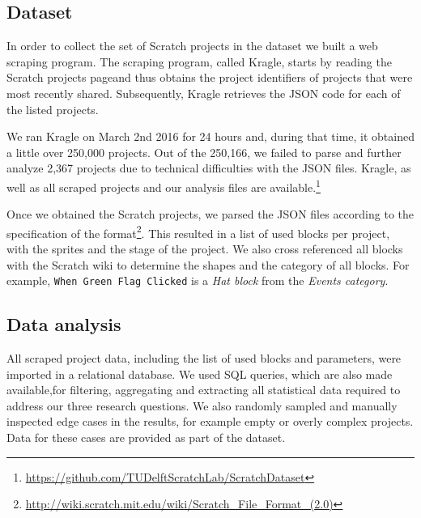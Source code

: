 \documentclass{sig-alternate-05-2015}
\newcommand{\nPrograms}{250,166}
\begin{document}
\subsection{Dataset}
\label{dataset}

In order to collect the set of Scratch projects in the dataset we built a web scraping program. The scraping program, called Kragle, starts by reading the Scratch projects page\footnotemark[\ref{scratchpublic}] and thus obtains the project identifiers of projects that were most recently shared. Subsequently, Kragle retrieves the JSON code for each of the listed projects. 


We ran Kragle on March 2nd 2016 for 24 hours and, during that time, it obtained a little over 250,000 projects. Out of the \nPrograms, we failed to parse and further analyze 2,367 projects due to technical difficulties with the JSON files. Kragle, as well as all scraped projects and our analysis files are available.\footnote{\label{repo}\url{https://github.com/TUDelftScratchLab/ScratchDataset}}

Once we obtained the Scratch projects, we parsed the JSON files according to the specification of the format\footnote{\url{http://wiki.scratch.mit.edu/wiki/Scratch_File_Format_(2.0)}}. This resulted in a list of used blocks per project, with the sprites and the stage of the project. We also cross referenced all blocks with the Scratch wiki to determine the shapes and the category of all blocks. For example, \texttt{When Green Flag Clicked} is a \emph{Hat block} from the \emph{Events category}.

\subsection{Data analysis}
\label{dataAnalysis}
All scraped project data, including the list of used blocks and parameters, were imported in a relational database. We used SQL queries, which are also made available,\footnotemark[\ref{repo}] for filtering, aggregating and extracting all statistical data required to address our three research questions. We also randomly sampled and manually inspected edge cases in the results, for example empty or overly complex projects. Data for these cases are provided as part of the dataset.\footnotemark[\ref{repo}]
\end{document}
